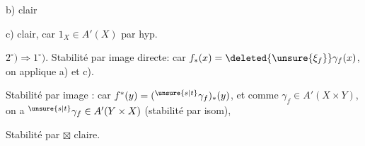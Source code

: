 b) clair

c) clair, car $1_X\in A'(X)$ par hyp.

$2^\circ)\Longrightarrow1^\circ)$. Stabilité par image  directe: car $f_*(x)=\deleted{\unsure{\xi_f}}\gamma_f(x)$, on applique a) et c).

Stabilité par image  : car $f^*(y)=({}^{\unsure{s|t}}\gamma_f)_*(y)$, et comme $\gamma_f\in A'(X\times Y)$, on a ${}^{\unsure{s|t}}\gamma_f\in A'(Y\times X)$ (stabilité par isom),

Stabilité par $\boxtimes$ claire.
